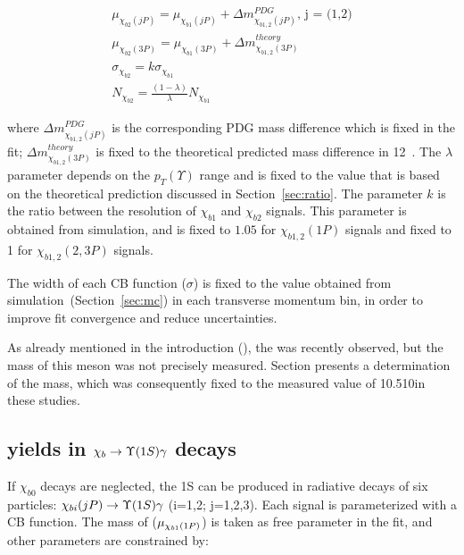 \begin{equation}
  \begin{aligned}
\mu_{\chi_{b2}(jP)} = \mu_{\chi_{b1}(jP)} + \Delta m_{\chi_{b1,2}(jP)}^{PDG} \text{, j = (1,2)}\\
\mu_{\chi_{b2}(3P)} = \mu_{\chi_{b1}(3P)} + \Delta m_{\chi_{b1,2}(3P)}^{theory} \\
\sigma_{\chi_{b2}} = k \sigma_{\chi_{b1}}\\
N_{\chi_{b2}} = \frac{(1-\lambda)}{\lambda} N_{\chi_{b1}}
  \end{aligned}
\end{equation}

\noindent where $\Delta m_{\chi_{b1,2}(jP)}^{PDG}$ is the corresponding PDG
mass difference which is fixed in the fit; $\Delta
m_{\chi_{b1,2}(3P)}^{theory}$ is fixed to the theoretical predicted mass
difference in 12\mevcc~\cite{Motyka:1997di}. The $\lambda$ parameter depends on
the $p_T(\Upsilon)$ range and is fixed to the value that is based on the
theoretical prediction discussed in Section~\ref{sec:ratio}. The parameter $k$
is the ratio between the resolution of $\chi_{b1}$ and $\chi_{b2}$ signals.
This parameter is obtained from simulation, and is fixed to $1.05$ for
$\chi_{b1,2}(1P)$ signals and fixed to 1 for $\chi_{b1,2}(2,3P)$ signals.

The width of each CB function ($\sigma$) is fixed to the value obtained from
simulation~(Section~\ref{sec:mc}) in each transverse momentum bin, in order to
improve fit convergence and reduce uncertainties.

As already mentioned in the introduction (), the \chibThreeP  was
recently observed, but the mass of this meson was not precisely measured. 
Section  presents a determination of the \chibThreeP mass, which 
was consequently fixed to the measured value of 10.510\gevcc in these studies. 

\subsection{\texorpdfstring{\chib}{xb} yields in
\texorpdfstring{$\chib \to \Y1S \gamma$}{xb -> Y\(1S\) gamma } decays}
\label{sec:chib:ups1s:fit}

If $\chi_{b0}$ decays are neglected, the \Y1S can be produced in radiative decays
of six \chib particles: $\chi_{bi}(jP) \to \Y1S \gamma$ (i=1,2; j=1,2,3). 
Each \chib signal is parameterized with a CB function.
The mass of \chiboneOneP ($\mu_{\chi_{b 1}(1P)}$) is taken as free parameter in the fit, and  other
parameters are constrained by:

